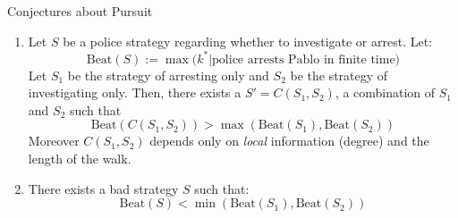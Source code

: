 \documentclass[xcolor=dvipsnames]{beamer}
\begin{document}
\begin{frame}{Conjectures about Pursuit}

\begin{enumerate}
\item Let $S$ be a police strategy regarding whether to investigate or arrest.  Let:
$$
\textrm{Beat}(S) := \max{(k^* | \textrm{police arrests Pablo in finite time}})
$$
Let $S_1$ be the strategy of arresting only and $S_2$ be the strategy of investigating only.  Then, there exists a $S' = C(S_1, S_2)$, a  combination of $S_1$ and $S_2$ such that
$$
\textrm{Beat}(C(S_1, S_2)) > \max(\textrm{Beat}(S_1), \textrm{Beat}(S_2))
$$
Moreover $C(S_1, S_2)$ depends only on \textit{local} information (degree) and the length of the walk.
\item There exists a bad strategy $S$ such that:
$$
\textrm{Beat}(S) < \min (\textrm{Beat}(S_1), \textrm{Beat}(S_2))
$$
\end{enumerate}
\end{frame}

%
\end{document}
